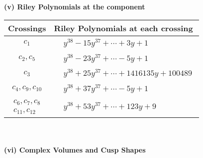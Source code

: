 \documentclass[1p]{elsarticle_modified}
\theoremstyle{definition}
\begin{document}
\newpage\renewcommand{\arraystretch}{1}
\flushleft \textbf{(v) Riley Polynomials at the component}\newline \\
\begin{tabular}{m{50pt}|m{274pt}}
Crossings & \hspace{64pt}Riley Polynomials at each crossing \\
\hline $$\begin{aligned}c_{1}\end{aligned}$$&$\begin{aligned}
&y^{38}-15 y^{37}+\cdots+3 y+1
\end{aligned}$\\
\hline $$\begin{aligned}c_{2},c_{5}\end{aligned}$$&$\begin{aligned}
&y^{38}-23 y^{37}+\cdots-5 y+1
\end{aligned}$\\
\hline $$\begin{aligned}c_{3}\end{aligned}$$&$\begin{aligned}
&y^{38}+25 y^{37}+\cdots+1416135 y+100489
\end{aligned}$\\
\hline $$\begin{aligned}c_{4},c_{9},c_{10}\end{aligned}$$&$\begin{aligned}
&y^{38}+37 y^{37}+\cdots-5 y+1
\end{aligned}$\\
\hline $$\begin{aligned}c_{6},c_{7},c_{8}\\c_{11},c_{12}\end{aligned}$$&$\begin{aligned}
&y^{38}+53 y^{37}+\cdots+123 y+9
\end{aligned}$\\
\hline
\end{tabular}\\~\\
\newpage\flushleft \textbf{(vi) Complex Volumes and Cusp Shapes}
\end{document}
